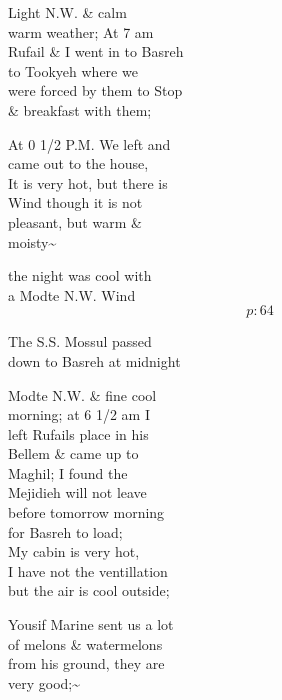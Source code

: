 \documentclass{report}
\begin{document}
	\par{
 	Light N.W. \& calm\ \\warm weather; At 7 am\ \\Rufail \& I went in to Basreh\ \\to Tookyeh where we\ \\were forced by them to Stop\ \\\& breakfast with them;\ \\
	}

	\par{
 	At 0 1/2 P.M. We left and\ \\came out to the house,\ \\It is very hot, but there is\ \\Wind though it is not\ \\pleasant, but warm \&\ \\moisty\~{}\ \\
	}

	\par{
 	the night was cool with\ \\a Modte N.W. Wind\ \\
  \[p: 64 \]

	}

	\par{
 	The S.S. Mossul passed\ \\down to Basreh at midnight\ \\
	}

	\par{
 	Modte N.W. \& fine cool\ \\morning; at 6 1/2 am I\ \\left Rufails place in his\ \\Bellem \& came up to\ \\Maghil; I found the\ \\Mejidieh will not leave\ \\before tomorrow morning\ \\for Basreh to load;\ \\My cabin is very hot,\ \\I have not the ventillation\ \\but the air is cool outside;\ \\
	}

	\par{
 	Yousif Marine sent us a lot\ \\of melons \& watermelons\ \\from his ground, they are\ \\very good;\~{}\ \\
	}
\end{document}
